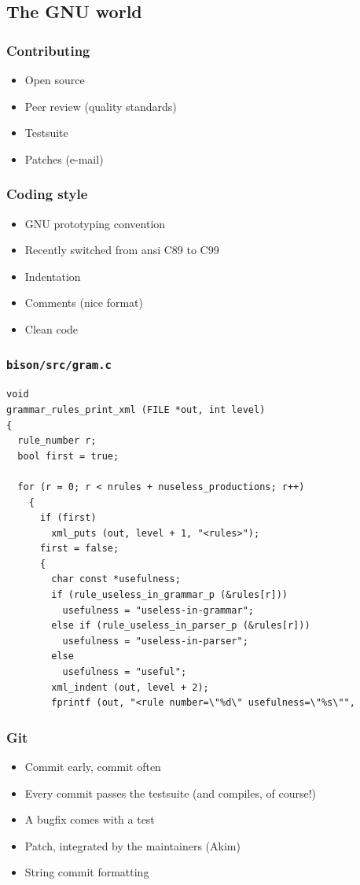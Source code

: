 \documentclass{beamer}
\begin{document}
\subsection{The GNU world}

\begin{frame}
  \frametitle{Contributing}
    \begin{itemize}
      \item Open source
      \item Peer review (quality standards)
      \item Testsuite
      \item Patches (e-mail)
    \end{itemize}
\end{frame}

\begin{frame}
  \frametitle{Coding style}
    \begin{itemize}
      \item GNU prototyping convention
      \item Recently switched from ansi C89 to C99
      \item Indentation
      \item Comments (nice format)
      \item Clean code
    \end{itemize}
\end{frame}

\begin{frame}[fragile,shrink=25]
  \frametitle{\texttt{bison/src/gram.c}}
\begin{verbatim}
void
grammar_rules_print_xml (FILE *out, int level)
{
  rule_number r;
  bool first = true;

  for (r = 0; r < nrules + nuseless_productions; r++)
    {
      if (first)
        xml_puts (out, level + 1, "<rules>");
      first = false;
      {
        char const *usefulness;
        if (rule_useless_in_grammar_p (&rules[r]))
          usefulness = "useless-in-grammar";
        else if (rule_useless_in_parser_p (&rules[r]))
          usefulness = "useless-in-parser";
        else
          usefulness = "useful";
        xml_indent (out, level + 2);
        fprintf (out, "<rule number=\"%d\" usefulness=\"%s\"",
\end{verbatim}
\end{frame}

\begin{frame}
  \frametitle{Git}
    \begin{itemize}
      \item Commit early, commit often
      \item Every commit passes the testsuite (and compiles, of course!)
      \item A bugfix comes with a test
      \item Patch, integrated by the maintainers (Akim)
      \item String commit formatting
    \end{itemize}
\end{frame}
\end{document}
